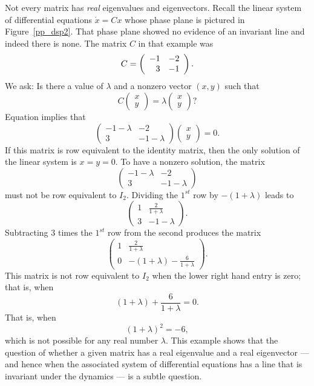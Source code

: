 \documentclass{ximera}
\begin{document}
Not every matrix has {\em real\/} eigenvalues and
eigenvectors.  Recall the linear system of differential 
equations $\dot{x}=Cx$ whose phase plane is pictured in Figure~\ref{pp_dsp2}.  
That phase plane showed no evidence of an invariant line and indeed there is 
none.  The matrix $C$ in that example was
\[
C=\left(\begin{array}{rr} -1 & -2\\ 3 &-1\end{array}\right).
\]
We ask: Is there a value of $\lambda$ and a nonzero vector
$(x,y)$ such that
\begin{equation}  \label{E:eigexamp}
C\left(\begin{array}{c} x\\y\end{array}\right) =
\lambda  \left(\begin{array}{c} x\\y\end{array}\right)?
\end{equation}
Equation  implies that
\[
\left(\begin{array}{cc} -1-\lambda & -2 \\ 3 & -1-\lambda
\end{array}\right) \left(\begin{array}{c}
x\\y\end{array}\right) =0.
\]
If this matrix is row equivalent to the identity matrix, then
the only solution of the linear system is $x=y=0$.  To have a
nonzero solution, the matrix
\[
\left(\begin{array}{cc} -1-\lambda & -2 \\ 3 & -1-\lambda
\end{array}\right)
\]
must not be row equivalent to $I_2$.  Dividing the $1^{st}$ row by
$-(1+\lambda)$ leads to
\[
\left(\begin{array}{cc} 1 & \frac{2}{1+\lambda} \\ 3 & -1-\lambda
\end{array}\right).
\]
Subtracting $3$ times the $1^{st}$ row from the second produces
the matrix
\[
\left(\begin{array}{cc} 1 & \frac{2}{1+\lambda} \\ 0 &
-(1+\lambda) - \frac{6}{1+\lambda}
\end{array}\right).
\]
This matrix is not row equivalent to $I_2$ when the lower
right hand entry is zero; that is, when
\[
(1+\lambda) +\frac{6}{1+\lambda} = 0.
\]
That is, when
\[
(1+\lambda)^2 = -6,
\]
which is not possible for any real number $\lambda$.  This
example shows that the question of whether a given matrix has a
real eigenvalue and a real eigenvector --- and hence when the
associated system of differential equations has a line that is
invariant under the dynamics --- is a subtle question.
\end{document}
